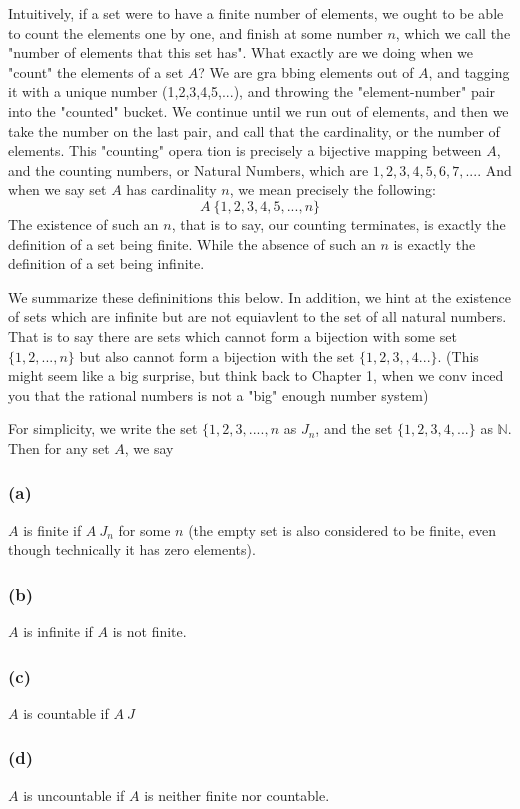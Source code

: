 \documentclass[../../templates/section]{subfiles}
\begin{document}
\begin{definition}
 Intuitively, if a set were to have a finite number of elements, we ought to be 
 able to count the elements one by one, and finish at some number $n$, which we
  call the "number of elements that this set has". 
What exactly are we doing when we "count" the elements of a set $A$? We are gra
bbing elements out of $A$, and tagging it with a unique number (1,2,3,4,5,...), 
and throwing the "element-number" pair into the "counted" bucket. We continue 
until we run out of elements, and then we take the number on the last pair,
and call that the cardinality, or the number of elements. This "counting" opera
tion is precisely a bijective mapping between $A$, and the counting numbers, or
Natural Numbers, which are $1,2,3,4,5,6,7,...$. And when we say set $A$ has 
cardinality $n$, we mean precisely the following:
\[
A~\{1,2,3,4,5,...,n\}
\]
The existence of such an $n$, that is to say, our counting terminates, is exactly 
the definition of a set being finite. While the absence of such an $n$ is exactly 
the definition of a set being infinite. 

We summarize these defininitions this below. In addition, we hint at the 
existence of sets which are infinite but are not equiavlent to the set of all 
natural numbers. That 
is to say there are sets which cannot form a bijection with some set 
$\{1,2,...,n\}$ but also cannot form a bijection with the set $\{1,2,3,,4...\}$. 
(This might seem like a big surprise, but think back to Chapter 1, when we conv
inced you that the rational numbers is not a "big" enough number system)

\begin{definition}
For simplicity, we write the set $\{1,2,3,....,n$ as $J_n$, and the set 
$\{1,2,3,4,...\}$ as $\mathbb{N}$. Then for any set $A$, we say
\subsubsection*{(a)}
$A$ is finite if $A~J_n$ for some $n$ (the empty set is also considered to be 
finite, even though technically it has zero elements).
\subsubsection*{(b)}
$A$ is infinite if $A$ is not finite.
\subsubsection*{(c)}
$A$ is countable if $A~J$
\subsubsection*{(d)}
$A$ is uncountable if $A$ is neither finite nor countable.

\end{definition}
\end{definition}
\end{document}
